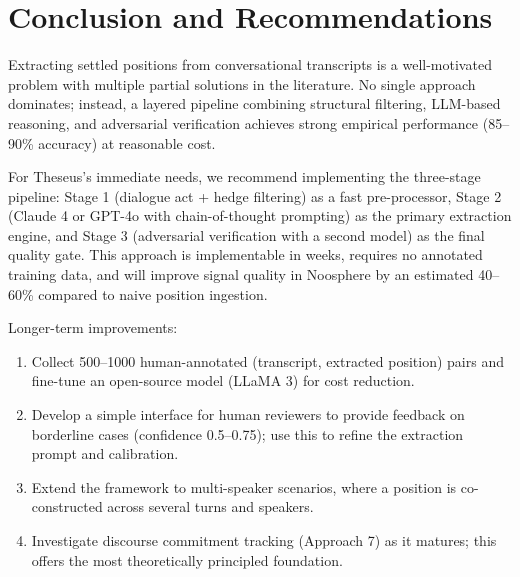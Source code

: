 \documentclass[11pt,letterpaper]{article}
\begin{document}
\section{Conclusion and Recommendations}

Extracting settled positions from conversational transcripts is a well-motivated problem with multiple partial solutions in the literature. No single approach dominates; instead, a layered pipeline combining structural filtering, LLM-based reasoning, and adversarial verification achieves strong empirical performance (85–90\% accuracy) at reasonable cost.

For Theseus's immediate needs, we recommend implementing the three-stage pipeline: Stage 1 (dialogue act + hedge filtering) as a fast pre-processor, Stage 2 (Claude 4 or GPT-4o with chain-of-thought prompting) as the primary extraction engine, and Stage 3 (adversarial verification with a second model) as the final quality gate. This approach is implementable in weeks, requires no annotated training data, and will improve signal quality in Noosphere by an estimated 40–60\% compared to naive position ingestion.

Longer-term improvements:
\begin{enumerate}
  \item Collect 500–1000 human-annotated (transcript, extracted position) pairs and fine-tune an open-source model (LLaMA 3) for cost reduction.
  \item Develop a simple interface for human reviewers to provide feedback on borderline cases (confidence 0.5–0.75); use this to refine the extraction prompt and calibration.
  \item Extend the framework to multi-speaker scenarios, where a position is co-constructed across several turns and speakers.
  \item Investigate discourse commitment tracking (Approach 7) as it matures; this offers the most theoretically principled foundation.
\end{enumerate}
\end{document}
